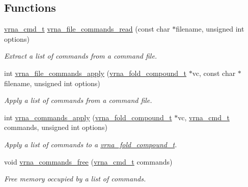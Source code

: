 \subsection*{Functions}
\begin{DoxyCompactItemize}
\item 
\mbox{\hyperlink{group__command__files_gaf31afe4c5f8e4bf44a670ab4c3dcd916}{vrna\+\_\+cmd\+\_\+t}} \mbox{\hyperlink{group__command__files_gae5f56400ed43683338f7bf1c1102655a}{vrna\+\_\+file\+\_\+commands\+\_\+read}} (const char $\ast$filename, unsigned int options)
\begin{DoxyCompactList}\small\item\em Extract a list of commands from a command file. \end{DoxyCompactList}\item 
int \mbox{\hyperlink{group__command__files_gadbe8c9622f7bcc6dcbe3448b98df8656}{vrna\+\_\+file\+\_\+commands\+\_\+apply}} (\mbox{\hyperlink{group__fold__compound_ga1b0cef17fd40466cef5968eaeeff6166}{vrna\+\_\+fold\+\_\+compound\+\_\+t}} $\ast$vc, const char $\ast$filename, unsigned int options)
\begin{DoxyCompactList}\small\item\em Apply a list of commands from a command file. \end{DoxyCompactList}\item 
int \mbox{\hyperlink{group__command__files_gac65d0fe86f7671a2d2b85dda1a3ddc16}{vrna\+\_\+commands\+\_\+apply}} (\mbox{\hyperlink{group__fold__compound_ga1b0cef17fd40466cef5968eaeeff6166}{vrna\+\_\+fold\+\_\+compound\+\_\+t}} $\ast$vc, \mbox{\hyperlink{group__command__files_gaf31afe4c5f8e4bf44a670ab4c3dcd916}{vrna\+\_\+cmd\+\_\+t}} commands, unsigned int options)
\begin{DoxyCompactList}\small\item\em Apply a list of commands to a \mbox{\hyperlink{group__fold__compound_ga1b0cef17fd40466cef5968eaeeff6166}{vrna\+\_\+fold\+\_\+compound\+\_\+t}}. \end{DoxyCompactList}\item 
void \mbox{\hyperlink{group__command__files_ga3dc372dcbb43d2c4c91b5ef79b460428}{vrna\+\_\+commands\+\_\+free}} (\mbox{\hyperlink{group__command__files_gaf31afe4c5f8e4bf44a670ab4c3dcd916}{vrna\+\_\+cmd\+\_\+t}} commands)
\begin{DoxyCompactList}\small\item\em Free memory occupied by a list of commands. \end{DoxyCompactList}\end{DoxyCompactItemize}


